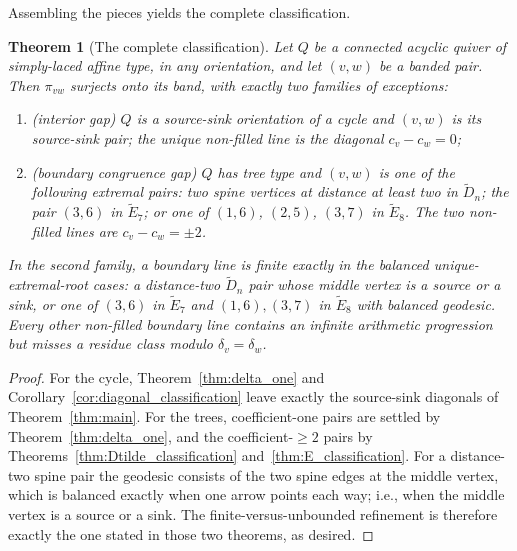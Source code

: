\documentclass[11pt, a4paper]{amsart}
\newtheorem{theorem}{Theorem}[section]
\theoremstyle{definition}
\begin{document}
Assembling the pieces yields the complete classification.

\begin{theorem}[The complete classification]
\label{thm:complete_classification}
Let $Q$ be a connected acyclic quiver of simply-laced affine type, in any
orientation, and let $(v, w)$ be a banded pair. Then $\pi_{vw}$ surjects onto its band,
with exactly two families of exceptions:
\begin{enumerate}[label=\textup{(\arabic*)}]
\item \textup{(interior gap)} $Q$ is a source-sink orientation of a cycle
  and $(v, w)$ is its source-sink pair; the unique non-filled line is the
  diagonal $c_v - c_w = 0$;
\item \textup{(boundary congruence gap)} $Q$ has tree type and $(v,w)$ is
  one of the following extremal pairs: two spine vertices at distance at
  least two in $\widetilde D_n$; the pair $(3,6)$ in $\widetilde E_7$; or
  one of $(1,6)$, $(2,5)$, $(3,7)$ in $\widetilde E_8$. The two non-filled
  lines are $c_v-c_w=\pm2$.
\end{enumerate}
In the second family, a boundary line is finite exactly in the balanced
unique-extremal-root cases: a distance-two $\widetilde D_n$ pair whose
middle vertex is a source or a sink, or one of $(3,6)$ in
$\widetilde E_7$ and $(1,6),(3,7)$ in $\widetilde E_8$ with balanced
geodesic. Every other non-filled boundary line contains an infinite
arithmetic progression but misses a residue class modulo
$\delta_v=\delta_w$.
\end{theorem}

\begin{proof}
For the cycle, Theorem~\ref{thm:delta_one} and
Corollary~\ref{cor:diagonal_classification} leave exactly the source-sink
diagonals of Theorem~\ref{thm:main}. For the trees, coefficient-one pairs
are settled by Theorem~\ref{thm:delta_one}, and the coefficient-$\geq 2$
pairs by Theorems~\ref{thm:Dtilde_classification}
and~\ref{thm:E_classification}. For a distance-two spine pair the geodesic
consists of the two spine edges at the middle vertex, which is balanced
exactly when one arrow points each way; i.e., when the middle vertex is a
source or a sink. The finite-versus-unbounded refinement is therefore
exactly the one stated in those two theorems, as desired.
\end{proof}
\end{document}
